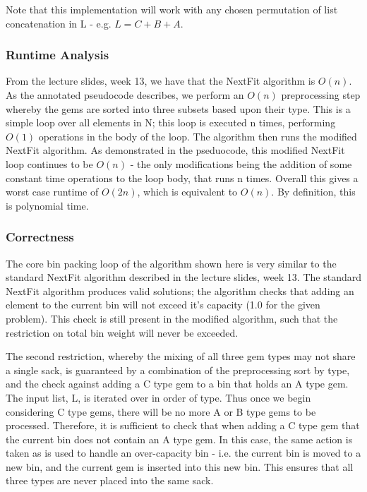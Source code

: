 \documentclass[paper=a4, fontsize=12pt]{article}
\begin{document}
Note that this implementation will work with any chosen permutation of list
concatenation in L - e.g. \(L = C + B + A\).

\subsubsection{Runtime Analysis}
From the lecture slides, week 13, we have that the NextFit algorithm is
\(O(n)\). As the annotated pseudocode describes, we perform an \(O(n)\)
preprocessing step whereby the gems are sorted into three subsets based upon
their type. This is a simple loop over all elements in N; this loop is executed
n times, performing \(O(1)\) operations in the body of the loop. The algorithm
then runs the modified NextFit algorithm. As demonstrated in the pseduocode,
this modified NextFit loop continues to be \(O(n)\) - the only modifications
being the addition of some constant time operations to the loop body, that runs
n times. Overall this gives a worst case runtime of \(O(2n)\), which is
equivalent to \(O(n)\). By definition, this is polynomial time.

\subsubsection{Correctness}
The core bin packing loop of the algorithm shown here is very similar to the
standard NextFit algorithm described in the lecture slides, week 13. The
standard NextFit algorithm produces valid solutions; the algorithm checks that
adding an element to the current bin will not exceed it's capacity (1.0 for the
given problem). This check is still present in the modified algorithm, such
that the restriction on total bin weight will never be exceeded.

The second restriction, whereby the mixing of all three gem types may not share
a single sack, is guaranteed by a combination of the preprocessing sort by
type, and the check against adding a C type gem to a bin that holds an A type
gem. The input list, L, is iterated over in order of type. Thus once we begin
considering C type gems, there will be no more A or B type gems to be
processed. Therefore, it is sufficient to check that when adding a C type gem
that the current bin does not contain an A type gem. In this case, the same
action is taken as is used to handle an over-capacity bin - i.e. the current
bin is moved to a new bin, and the current gem is inserted into this new
bin. This ensures that all three types are never placed into the same sack.
\end{document}
